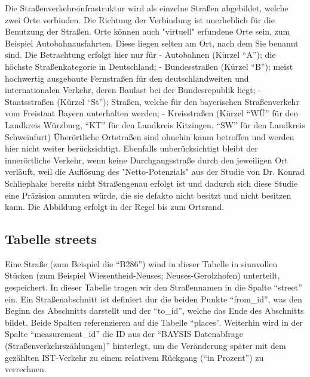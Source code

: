 \documentclass[fontsize=12pt,a4paper]{scrreprt}
\begin{document}
Die Straßenverkehrsinfrastruktur wird als einzelne Straßen abgebildet, welche zwei Orte verbinden. Die Richtung der Verbindung ist unerheblich für die Benutzung der Straßen. Orte können auch "virtuell" erfundene Orte sein, zum Beispiel Autobahnausfahrten. Diese liegen selten am Ort, nach dem Sie benannt sind.\newline
\newline
Die Betrachtung erfolgt hier nur für\newline
- Autobahnen (Kürzel \enquote{A}); die höchste Straßenkategorie in Deutschland;\newline
- Bundesstraßen (Kürzel \enquote{B}); meist hochwertig ausgebaute Fernstraßen für den deutschlandweiten und internationalen Verkehr, deren Baulast bei der Bundesrepublik liegt;\newline
- Staatsstraßen (Kürzel \enquote{St}); Straßen, welche für den bayerischen Straßenverkehr vom Freistaat Bayern unterhalten werden;\newline
- Kreisstraßen (Kürzel \enquote{WÜ} für den Landkreis Würzburg, \enquote{KT} für den Landkreis Kitzingen, \enquote{SW} für den Landkreis Schweinfurt)\newline
\newline
Überörtliche Ortstraßen sind ohnehin kaum betroffen und werden hier nicht weiter berücksichtigt.\newline
\newline
Ebenfalls unberücksichtigt bleibt der innerörtliche Verkehr, wenn keine Durchgangsstraße durch den jeweiligen Ort verläuft, weil die Auflösung des "Netto-Potenzials" aus der Studie von Dr. Konrad Schliephake bereits nicht Straßengenau erfolgt ist und dadurch sich diese Studie eine Präzision anmuten würde, die sie defakto nicht besitzt und nicht besitzen kann. Die Abbildung erfolgt in der Regel bis zum Ortsrand.

\subsection{Tabelle streets}

Eine Straße (zum Beispiel die \enquote{B286}) wind in dieser Tabelle in sinnvollen Stücken (zum Beispiel Wiesentheid-Neuses; Neuses-Gerolzhofen) unterteilt, gespeichert. In dieser Tabelle tragen wir den Straßennamen in die Spalte \enquote{street} ein. Ein Straßenabschnitt ist definiert dur die beiden Punkte \enquote{from_id}, was den Beginn des Abschnitts darstellt und der \enquote{to_id}, welche das Ende des Abschnitts bildet. Beide Spalten referenzieren auf die Tabelle \enquote{places}. Weiterhin wird in der Spalte \enquote{measurement_id} die ID aus der \enquote{BAYSIS Datenabfrage (Straßenverkehrszählungen)} hinterlegt, um die Veränderung später mit dem gezählten IST-Verkehr zu einem relativem Rückgang (\enquote{in Prozent}) zu verrechnen.
\end{document}
